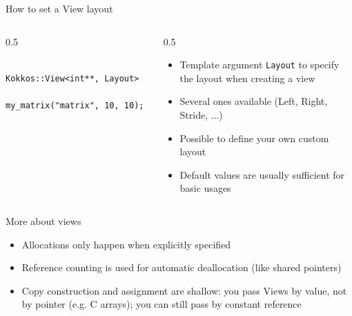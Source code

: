 \documentclass[
    aspectratio=169,
]{beamer}
\begin{document}
\begin{frame}[fragile]{How to set a View layout}
    \begin{columns}
        \begin{column}{0.5\linewidth}
            \begin{verbatim}
                Kokkos::View<int**, Layout>
                    my_matrix("matrix", 10, 10);
            \end{verbatim}
        \end{column}
        \begin{column}{0.5\linewidth}
            \begin{itemize}
                \item Template argument \texttt{Layout} to specify the layout when creating a view
                \item Several ones available (Left, Right, Stride, ...)
                \item Possible to define your own custom layout
                \item Default values are usually sufficient for basic usages
            \end{itemize}
        \end{column}
    \end{columns}
\end{frame}

\begin{frame}{More about views}
    \begin{itemize}
        \item Allocations only happen when explicitly specified
        \pause
        \item Reference counting is used for automatic deallocation (like shared pointers)
        \pause
        \item Copy construction and assignment are shallow: you pass Views by value, not by pointer (e.g. C arrays); you can still pass by constant reference
    \end{itemize}
\end{frame}
\end{document}
